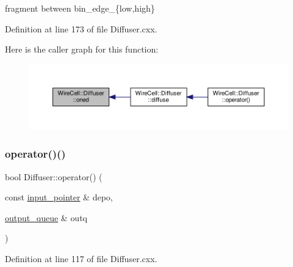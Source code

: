 fragment between bin\+\_\+edge\+\_\+\{low,high\} 

Definition at line 173 of file Diffuser.\+cxx.

Here is the caller graph for this function\+:
\nopagebreak
\begin{figure}[H]
\begin{center}
\leavevmode
\includegraphics[width=350pt]{class_wire_cell_1_1_diffuser_a19e1586fdca351c264970065699e9c39_icgraph}
\end{center}
\end{figure}
\mbox{\label{class_wire_cell_1_1_diffuser_a05506f9621f1221253d4d4f6701ca180}} 
\subsubsection{\texorpdfstring{operator()()}{operator()()}}
{\footnotesize\ttfamily bool Diffuser\+::operator() (\begin{DoxyParamCaption}\item[{const \hyperlink{class_wire_cell_1_1_i_queuedout_node_acf5f716a764553f3c7055a9cf67e906e}{input\+\_\+pointer} \&}]{depo,  }\item[{\hyperlink{class_wire_cell_1_1_i_queuedout_node_a39018e4e3dd886befac9636ac791a685}{output\+\_\+queue} \&}]{outq }\end{DoxyParamCaption})\hspace{0.3cm}{\ttfamily [virtual]}}



Definition at line 117 of file Diffuser.\+cxx.

